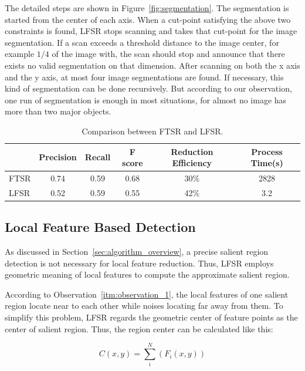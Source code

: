 The detailed steps are shown in Figure~\ref{fig:segmentation}. The segmentation is started from the center of each axis. When a cut-point satisfying the above two constraints is found, LFSR stops scanning and takes that cut-point for the image segmentation. If a scan exceeds a threshold distance to the image center, for example $1/4$ of the image with, the scan should stop and announce that there exists no valid segmentation on that dimension. After scanning on both the x axis and the y axis, at most four image segmentations are found. If necessary, this kind of segmentation can be done recursively. But according to our observation, one run of segmentation is enough in most situations, for almost no image has more than two major objects.

\begin{table}[!t]
\begin{center}
\begin{tabular}{|l|c|c|c|c|c|}
\hline
 & Precision & Recall & F score & Reduction Efficiency & Process Time(s) \\
\hline\hline
FTSR & 0.74 & 0.59 & 0.68 & 30\% & 2828 \\
LFSR & 0.52 & 0.59 & 0.55 & 42\% & 3.2 \\
\hline
\end{tabular}
\end{center}
\caption{Comparison between FTSR and LFSR.}
\label{tab:comparison}
\end{table}

\subsection{Local Feature Based Detection}
\label{sec:algorithm_detection}

As discussed in Section~\ref{sec:algorithm_overview}, a precise salient region detection is not necessary for local feature reduction. Thus, LFSR employs geometric meaning of local features to compute the approximate salient region.

According to Observation~\ref{itm:observation_1}, the local features of one salient region locate near to each other while noises locating far away from them. To simplify this problem, LFSR regards the geometric center of feature points as the center of salient region. Thus, the region center can be calculated like this:

{\begin{equation} \label{eq:center}
C(x, y) = \sum_{i}^{N}\left({F}_{i}(x, y) \right)
\end{equation}}

